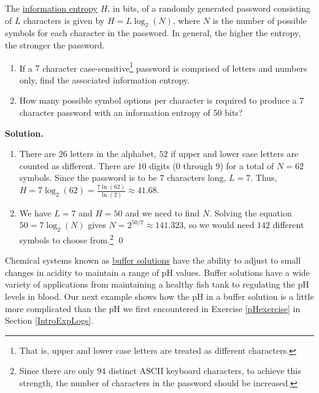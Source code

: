 \begin{ex}  The \href{http://en.wikipedia.org/wiki/Information_entropy}{\underline{information entropy}} $H$, in bits, of a randomly generated password consisting of $L$ characters is given by $H = L \log_{2}(N)$, where $N$ is the number of possible symbols for each character in the password.  In general, the higher the entropy, the stronger the password.  

\begin{enumerate}

\item  If a $7$ character case-sensitive\footnote{That is, upper and lower case letters are treated as different characters.} password is comprised of  letters and numbers only, find the associated information entropy.

\item  How many possible symbol options per character is required to produce a $7$ character password with an information entropy of $50$ bits?

\end{enumerate}

{\bf Solution.}

\begin{enumerate}

\item  There are $26$ letters in the alphabet, $52$ if upper and lower case letters are counted as different.  There are $10$ digits ($0$ through $9$) for a total of $N=62$ symbols.  Since the password is to be $7$ characters long, $L = 7$.  Thus, $H = 7 \log_{2}(62) = \frac{7 \ln(62)}{\ln(2)} \approx 41.68$.

\item  We have $L = 7$ and $H=50$ and we need to find $N$.  Solving the equation $50 = 7 \log_{2}(N)$ gives $N = 2^{50/7} \approx 141.323$, so we would need $142$ different symbols to choose from.\footnote{Since there are only $94$ distinct ASCII keyboard characters, to achieve this strength, the number of characters in the password should be increased.} \qed

\end{enumerate}

\end{ex}


Chemical systems known as \href{http://en.wikipedia.org/wiki/Buffer_solutions}{\underline{buffer solutions}}  have the ability to adjust to small changes in acidity to maintain a range of pH values.  Buffer solutions have a wide variety of applications from maintaining a healthy fish tank to regulating the pH levels in blood.  Our next example shows how the pH in a buffer solution is a little more complicated than the pH we first encountered in Exercise \ref{pHexercise} in Section \ref{IntroExpLogs}. 

